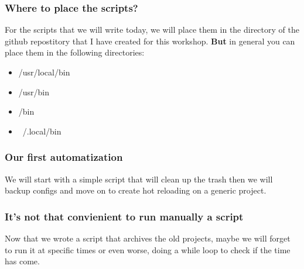 \documentclass{beamer}
\begin{document}
\begin{frame}
    \frametitle{Where to place the scripts?}
    \small
    For the scripts that we will write today, we will place them in the directory
    of the github repostitory that I have created for this workshop.
    \newline \newline
    \textbf{But} in general you can place them in the following directories:
    \begin{itemize}
        \item /usr/local/bin
        \item /usr/bin
        \item /bin
        \item ~/.local/bin
    \end{itemize}
\end{frame}

\begin{frame}
    \frametitle{Our first automatization}
    \small We will start with a simple script that will clean up the trash
    \newline then we will backup configs and move on to create hot reloading
    on a generic project.
\end{frame}

%
%
%
%
\begin{frame}
    \frametitle{It's not that convienient to run manually a script}
    \small
    Now that we wrote a script that archives the old projects,
    maybe we will forget to run it at specific times or even worse, doing a while
    loop to check if the time has come.
\end{frame}
\end{document}
